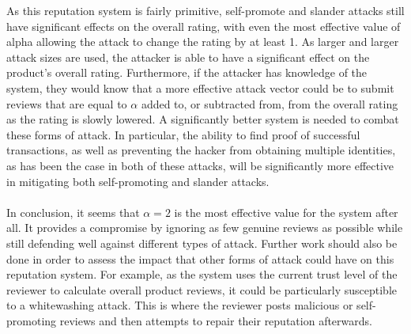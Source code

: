\documentclass{article}
\begin{document}
As this reputation system is fairly primitive, self-promote and slander attacks still have significant effects on the overall rating, with even the most effective value of alpha allowing the attack to change the rating by at least 1. As larger and larger attack sizes are used, the attacker is able to have a significant effect on the product's overall rating. Furthermore, if the attacker has knowledge of the system, they would know that a more effective attack vector could be to submit reviews that are equal to $\alpha$ added to, or subtracted from, from the overall rating as the rating is slowly lowered. A significantly better system is needed to combat these forms of attack. In particular, the ability to find proof of successful transactions, as well as preventing the hacker from obtaining multiple identities, as has been the case in both of these attacks, will be significantly more effective in mitigating both self-promoting and slander attacks.\cite{attack_defense}
\\\\
In conclusion, it seems that $\alpha = 2$ is the most effective value for the system after all. It provides a compromise by ignoring as few genuine reviews as possible while still defending well against different types of attack.
Further work should also be done in order to assess the impact that other forms of attack could have on this reputation system.
For example, as the system uses the current trust level of the reviewer to calculate overall product reviews, it could be particularly susceptible to a whitewashing attack. This is where the reviewer posts malicious or self-promoting reviews and then attempts to repair their reputation afterwards\cite{attack_defense}.

\newpage
\raggedright
{}

\newpage
\end{document}
